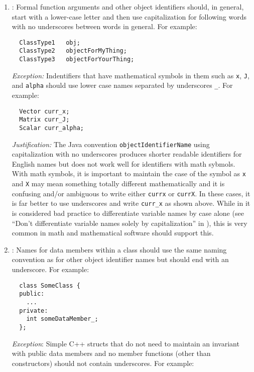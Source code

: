 \begin{enumerate}
{}\item\NCObjectNames: Formal function arguments and other object identifiers
should, in general, start with a lower-case letter and then use capitalization
for following words with no underscores between words in general.  For
example:

{\small\begin{verbatim}
  ClassType1   obj;
  ClassType2   objectForMyThing;
  ClassType3   objectForYourThing;
\end{verbatim}}

{}\textit{Exception:} Indentifiers that have mathematical symbols in them such
as {}\texttt{x}, {}\texttt{J}, and {}\texttt{alpha} should use lower case
names separated by underscores {}\texttt{\_}.  For example:

{\small\begin{verbatim}
  Vector curr_x;
  Matrix curr_J;
  Scalar curr_alpha;
\end{verbatim}}

{}\textit{Justification:} The Java convention {}\texttt{objectIdentifierName}
using capitalization with no underscores produces shorter readable identifiers
for English names but does not work well for identifiers with math sybmols.
With math symbols, it is important to maintain the case of the symbol as
{}\texttt{x} and {}\texttt{X} may mean something totally different
mathematically and it is confusing and/or ambiguous to write either
{}\texttt{currx} or {}\texttt{currX}.  In these cases, it is far better to use
underscores and write {}\texttt{curr\_x} as shown above.  While in it is
considered bad practice to differentiate variable names by case alone (see
``Don't differentiate variable names solely by capitalization'' in
{}\cite[Section 11.7]{CodeComplete2nd04}), this is very common in math and
mathematical software should support this.

{}\item\NCDataMemberNames: Names for data members within a class should use the
same naming convention as for other object identifier names but should end
with an underscore.  For example:

{\small\begin{verbatim}
  class SomeClass {
  public:
    ...
  private:
    int someDataMember_;
  };
\end{verbatim}}

{}\textit{Exception}: Simple C++ structs that do not need to maintain an
invariant with public data members and no member functions (other than
constructors) should not contain underscores.  For example:


\end{enumerate}
